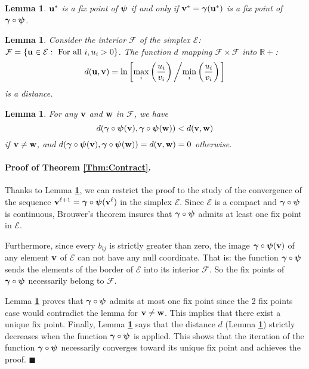\documentclass[10pt]{article}
\newcommand{\ubf}{{\bf u}}
\newcommand{\vbf}{{\bf v}}
\newcommand{\wbf}{{\bf w}}
\newcommand{\gammabf}{\mbox{\mathversion{bold}{$\gamma$}}}
\newcommand{\psibf}{\mbox{\mathversion{bold}{$\psi$}}}
\newcommand{\Rbb}{{\mathbb R}}
\newcommand{\Ecal}{{\mathcal E}}
\newcommand{\Fcal}{{\mathcal F}}
\newtheorem{lemma}[theorem]{Lemma}
\begin{document}
\begin{lemma} \label{Lem:Simplex}
  $\ubf^*$ is a fix point of $\psibf$ if and only if $\vbf^* = \gammabf(\ubf^*)$ is
  a fix point of $\gammabf \circ \psibf$.
\end{lemma}

\begin{lemma} \label{Lem:DefDistance}
  Consider the interior $\Fcal$ of the simplex $\Ecal$: $\Fcal =
  \{\ubf \in \Ecal: \mbox{ For all } i, u_i > 0\}$. The function $d$ mapping
  $\Fcal \times \Fcal$ into $\Rbb+$:
  $$
  d(\ubf, \vbf) = \ln \left[ \max_i \left(\frac{u_i}{v_i}\right)
    \left/ \min_i \left(\frac{u_i}{v_i}\right) \right. \right]
  $$
  is a distance.
\end{lemma}

\begin{lemma} \label{Lem:Decrease}
  For any $\vbf$ and $\wbf$ in $\Fcal$, we have
  $$
  d(\gammabf \circ \psibf(\vbf), \gammabf \circ \psibf(\wbf))  <
  d(\vbf, \wbf)
  $$
  if $\vbf \neq \wbf$, and $d(\gammabf \circ \psibf(\vbf), \gammabf
  \circ \psibf(\wbf)) = d(\vbf, \wbf) = 0$ otherwise.
\end{lemma}

\paragraph{Proof of Theorem {\bf \ref{Thm:Contract}}.}
Thanks to Lemma {\bf \ref{Lem:Simplex}}, we can restrict the proof to
the study of the convergence of the sequence $\vbf^{\ell+1} = \gammabf
\circ \psibf(\vbf^{\ell})$ in the simplex $\Ecal$. Since $\Ecal$ is a
compact and $\gammabf \circ \psibf$ is continuous, Brouwer's theorem
insures that $\gammabf \circ \psibf$ admits at least one fix point in
$\Ecal$.

Furthermore, since every $b_{ij}$ is strictly greater than zero, the
image $\gammabf \circ \psibf(\vbf)$ of any element $\vbf$ of $\Ecal$
can not have any null coordinate. That is: the function $\gammabf
\circ \psibf$ sends the elements of the border of $\Ecal$ into its
interior $\Fcal$. So the fix points of $\gammabf \circ \psibf$
necessarily belong to $\Fcal$.

Lemma {\bf \ref{Lem:Decrease}} proves that $\gammabf \circ \psibf$ admits at most one fix point since the 2 fix points case would contradict the lemma for
$\vbf \neq \wbf$. This implies that there exist a unique fix point. Finally, Lemma {\bf \ref{Lem:Decrease}} says that the distance $d$ (Lemma {\bf
\ref{Lem:DefDistance}}) strictly decreases when the function $\gammabf \circ \psibf$ is applied. This shows that the iteration of the function $\gammabf \circ
\psibf$ necessarily converges toward its unique fix point and achieves the proof.  $\blacksquare$
\end{document}
